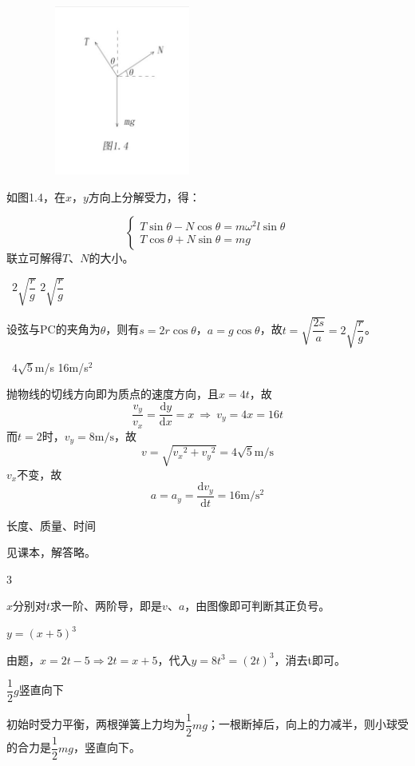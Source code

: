 \documentclass[b5paper,opensource,sourcefont,parskip]{qyxf-book}
\newcommand{\di}[1]{\mathrm{d}#1}
\newcommand{\dy}[2]{\frac{\di{#1}}{\di{#2}}}
\begin{document}
\begin{figure}[!htbp]
	\centering
	\includegraphics[width=15em, height=15em]{Chp1_illus4.png}
	\label{fig:c1}
\end{figure}

\solve 如图1.4，在$x$，$y$方向上分解受力，得：

\[\begin{cases}
T\sin\theta-N\cos\theta=m\omega^2l\sin\theta\\
T\cos\theta+N\sin\theta=mg
\end{cases}
\]
联立可解得$T$、$N$的大小。

\ $2\sqrt{\dfrac{r}{g}}$ \qquad $2\sqrt{\dfrac{r}{g}}$

\solve 设弦与PC的夹角为$\theta$，则有$s=2r\cos\theta$，$a=g\cos\theta$，故$t=\sqrt{\dfrac{2s}{a}}=2\sqrt{\dfrac{r}{g}}$。


\ $4\sqrt{5}$m/s \qquad 16m/s${}^2$ 

\solve 抛物线的切线方向即为质点的速度方向，且$x=4t$，故
\[\dfrac{v_y}{v_x}=\dy{y}{x}=x\ \Rightarrow\ v_y=4x=16t\]
而$t=2$时，$v_y=8\mathrm{m/s}$，故
\[v=\sqrt{{v_x}^2+{v_y}^2}=4\sqrt{5}\mathrm{m/s}\]
$v_x$不变，故
\[a=a_y=\dy{v_y}{t}=16\mathrm{m/s^2}\]

 长度、质量、时间

\solve 见课本，解答略。

 3

\solve $x$分别对$t$求一阶、两阶导，即是$v$、$a$，由图像即可判断其正负号。

 $y={(x+5)}^3$

\solve 由题，$x=2t-5\Rightarrow 2t=x+5$，代入$y=8t^3={(2t)}^3$，消去t即可。

 $\dfrac{1}{2}g$\qquad 竖直向下

\solve 初始时受力平衡，两根弹簧上力均为$\dfrac{1}{2}mg$；一根断掉后，向上的力减半，则小球受的合力是$\dfrac{1}{2}mg$，竖直向下。
\end{document}
